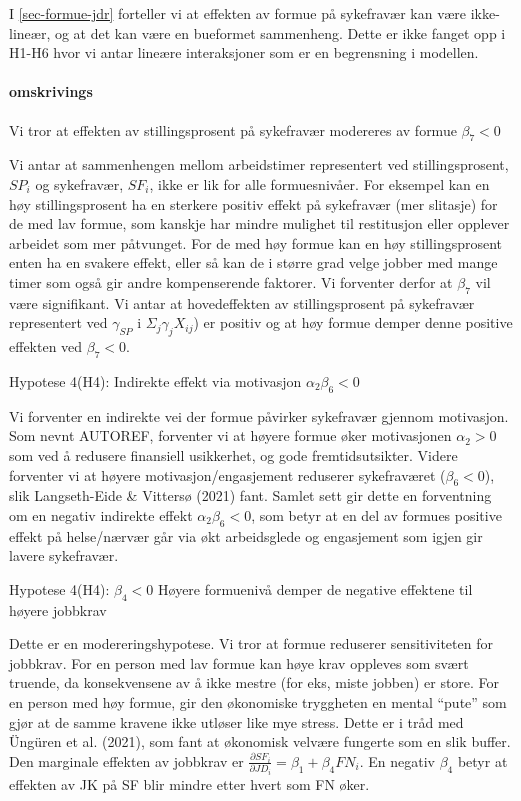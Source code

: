\documentclass[
  12pt,
  a4paper,
  DIV=11,
  numbers=noendperiod]{scrartcl}
\let\oldparagraph\paragraph
\renewcommand{\paragraph}[1]{\oldparagraph{#1}\mbox{}}
\begin{document}
I \autoref{sec-formue-jdr} forteller vi at effekten av formue på
sykefravær kan være ikke-lineær, og at det kan være en bueformet
sammenheng. Dette er ikke fanget opp i H1-H6 hvor vi antar lineære
interaksjoner som er en begrensning i modellen.

\paragraph{omskrivings}\label{omskrivings}

Vi tror at effekten av stillingsprosent på sykefravær modereres av
formue \(\beta_7 < 0\)

Vi antar at sammenhengen mellom arbeidstimer representert ved
stillingsprosent, \(SP_i\) og sykefravær, \(SF_i\), ikke er lik for alle
formuesnivåer. For eksempel kan en høy stillingsprosent ha en sterkere
positiv effekt på sykefravær (mer slitasje) for de med lav formue, som
kanskje har mindre mulighet til restitusjon eller opplever arbeidet som
mer påtvunget. For de med høy formue kan en høy stillingsprosent enten
ha en svakere effekt, eller så kan de i større grad velge jobber med
mange timer som også gir andre kompenserende faktorer. Vi forventer
derfor at \(\beta_7\) vil være signifikant. Vi antar at hovedeffekten av
stillingsprosent på sykefravær representert ved \(\gamma_{SP}\) i
\(\Sigma_j \gamma_{j}X_{ij}\)) er positiv og at høy formue demper denne
positive effekten ved \(\beta_7 < 0\).

Hypotese 4(H4): Indirekte effekt via motivasjon \(\alpha_2\beta_6 < 0\)

Vi forventer en indirekte vei der formue påvirker sykefravær gjennom
motivasjon. Som nevnt AUTOREF, forventer vi at høyere formue øker
motivasjonen \(\alpha_2 > 0\) som ved å redusere finansiell usikkerhet,
og gode fremtidsutsikter. Videre forventer vi at høyere
motivasjon/engasjement reduserer sykefraværet (\(\beta_6 <0\)), slik
Langseth-Eide \& Vittersø (2021) fant. Samlet sett gir dette en
forventning om en negativ indirekte effekt \(\alpha_2 \beta_6 <0\), som
betyr at en del av formues positive effekt på helse/nærvær går via økt
arbeidsglede og engasjement som igjen gir lavere sykefravær.

Hypotese 4(H4): \(\beta_4 < 0\) Høyere formuenivå demper de negative
effektene til høyere jobbkrav

Dette er en modereringshypotese. Vi tror at formue reduserer
sensitiviteten for jobbkrav. For en person med lav formue kan høye krav
oppleves som svært truende, da konsekvensene av å ikke mestre (for eks,
miste jobben) er store. For en person med høy formue, gir den økonomiske
tryggheten en mental ``pute'' som gjør at de samme kravene ikke utløser
like mye stress. Dette er i tråd med Üngüren et al. (2021), som fant at
økonomisk velvære fungerte som en slik buffer. Den marginale effekten av
jobbkrav er
\(\frac{\partial SF_i}{\partial JD_i} = \beta_1 + \beta_4 FN_i\). En
negativ \(\beta_4\) betyr at effekten av JK på SF blir mindre etter
hvert som FN øker.
\end{document}

